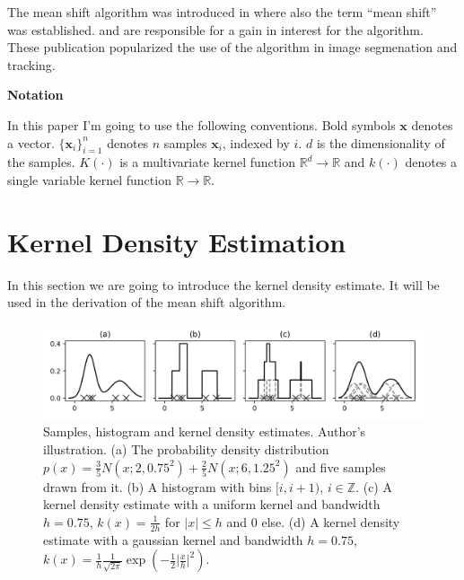 \documentclass{article}
\begin{document}
The mean shift algorithm was introduced in \cite{Fukunaga.1975} where also the term ``mean shift'' was established. \cite{Comaniciu.2002} and \cite{Comaniciu.2003} are responsible for a gain in interest for the algorithm. These publication popularized the use of the algorithm in image segmenation and tracking.


\textbf{Notation}

In this paper I'm going to use the following conventions. Bold symbols $\bm{x}$ denotes a vector. $\{ \bm{x}_i \}_{i=1}^n$ denotes $n$ samples $\bm{x}_i$, indexed by $i$. $d$ is the dimensionality of the samples. $K(\cdot)$ is a multivariate kernel function $\mathbb{R}^d \rightarrow \mathbb{R}$ and $k(\cdot)$ denotes a single variable kernel function $\mathbb{R} \rightarrow \mathbb{R}$.


\section{Kernel Density Estimation}

In this section we are going to introduce the kernel density estimate. It will be used in the derivation of the mean shift algorithm.

\begin{figure}
	\includegraphics[width=\textwidth]{figures/kde-kernel-density-estimates}
	\caption[Samples, histogram and kernel density estimates]{Samples, histogram and kernel density estimates. Author's illustration.
		(a) The probability density distribution $p(x) = \frac{3}{5} N(x; 2, 0.75^2) + \frac{2}{5} N(x; 6, 1.25^2)$ and five samples drawn from it.
		(b) A histogram with bins $[i,i+1)$, $i \in \mathbb{Z}$.
		(c) A kernel density estimate with a uniform kernel and bandwidth $h=0.75$, $k(x) = \frac{1}{2h}$ for $\lvert x \rvert \leq h$ and $0$ else.
		(d) A kernel density estimate with a gaussian kernel and bandwidth $h=0.75$, $k(x) = \frac{1}{h} \frac{1}{\sqrt{2\pi}} \exp(-\frac{1}{2} \lvert \frac{x}{h} \rvert^2)$.
	}
	\label{fig:kde-kernel-density-estimates}
\end{figure}

\end{document}
